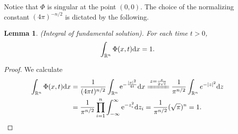 \documentclass[hyperref,UTF8,12pt]{article}
\numberwithin{equation}{subsection}
\theoremstyle{plain}
\newtheorem{lemma}{Lemma}
\theoremstyle{definition}
\numberwithin{theorem}{section}
\numberwithin{lemma}{section}
\numberwithin{proposition}{section}
\numberwithin{remark}{section}
\numberwithin{corollary}{section}
\numberwithin{definition}{section}
\numberwithin{problem}{section}
\numberwithin{example}{section}
\def\e{\textup{e}}
\def\dif{\textup{d}}
\newcommand{\mr}{\mathbb{R}}
\begin{document}
Notice that $\Phi$ is singular at the point $(0,0)$. The choice of the normalizing constant $(4 \pi)^{-n/2}$ is dictated by the following.
\begin{lemma}
(Integral of fundamental solution). For each time $t>0$,\[\int_{\mr^n}\Phi(x,t)\dif x=1.\]
\end{lemma}
\begin{proof}
We calculate
\[\begin{aligned}
	\int_{\mr^n}\Phi(x,t)\dif x&=\frac{1}{(4\pi t)^{n/2}}\int_{\mr^n}\e^{-\frac{|x|^2}{4 t}}\dif x\xlongequal{z=\frac{x}{2\sqrt{t}}}\frac{1}{\pi^{n/2}}\int_{\mr^n} e^{-|z|^2}\dif z\\
	&=\frac{1}{\pi^{n/2}}\prod_{i=1}^n \int_{-\infty}^\infty\e^{-z_i^2}\dif z_i=\frac{1}{\pi^{n/2}}(\sqrt{\pi})^n=1.
\end{aligned}\]
\end{proof}
\end{document}

